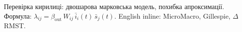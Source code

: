 \documentclass[12pt,a4paper]{article}
\begin{document}
Перевірка кирилиці: двошарова марковська модель, похибка апроксимації.
Формула: $\lambda_{ij}=\beta_{\text{out}}\,W_{ij}\,\bar i_i(t)\,\bar s_j(t)$.
English inline: MicroMacro, Gillespie, $\Delta$RMST.
\end{document}
